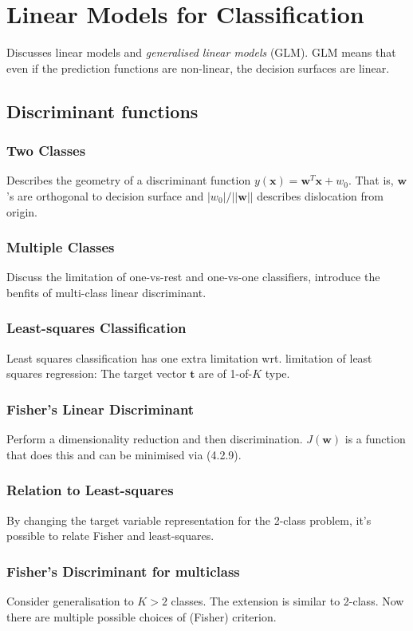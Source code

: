 \documentclass[a4paper]{article}
\newcommand{\mb}{\mathbf}
\begin{document}
\pagestyle{empty}
  

\section{Linear Models for Classification}
Discusses linear models and \textit{generalised linear models} (GLM). GLM means that even if the prediction functions are non-linear, the decision surfaces are linear.

\subsection{Discriminant functions}
\subsubsection{Two Classes}
Describes the geometry of a discriminant function $y(\mb{x}) = \mathbf{w}^T\mb{x}+w_0$. That is, $\mb{w}$'s are orthogonal to decision surface and $|w_0|/||\mb{w}||$ describes dislocation from origin.

\subsubsection{Multiple Classes}
Discuss the limitation of one-vs-rest and one-vs-one classifiers, introduce the benfits of multi-class linear discriminant.

\subsubsection{Least-squares Classification}
Least squares classification has one extra limitation wrt. limitation of least squares regression: The target vector $\mb{t}$ are of 1-of-$K$ type.

\subsubsection{Fisher's Linear Discriminant}
Perform a dimensionality reduction and then discrimination. $J(\mb{w})$ is a function that does this and can be minimised via (4.2.9).

\subsubsection{Relation to Least-squares}
By changing the target variable representation for the 2-class problem, it's possible to relate Fisher and least-squares.

\subsubsection{Fisher's Discriminant for multiclass}
Consider generalisation to $K>2$ classes. The extension is similar to 2-class. Now there are multiple possible choices of (Fisher) criterion.
\end{document}
